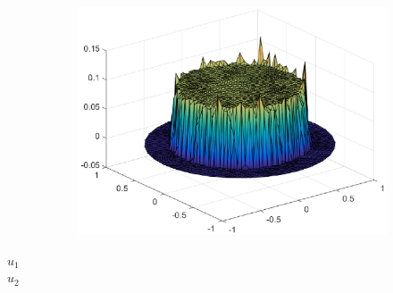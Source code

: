 \documentclass[10 pt]{beamer}
\begin{document}
\begin{frame}[t]
\begin{figure}[t]
\begin{subfigure}[normal]{0.5\textwidth}
\end{subfigure}
\begin{subfigure}[normal]{0.49\textwidth}
\includegraphics[width=\textwidth]{lambda_exact_resolution_convergence_J_3.eps}     
\label{ref:lambda_membrane_convergence} 
\end{subfigure}
\end{figure}
\vspace*{-4cm}\hspace*{0.75cm}$u_1$\\
\vspace*{0.6cm}\hspace*{0.75cm}$u_2$
\end{frame}
\end{document}
